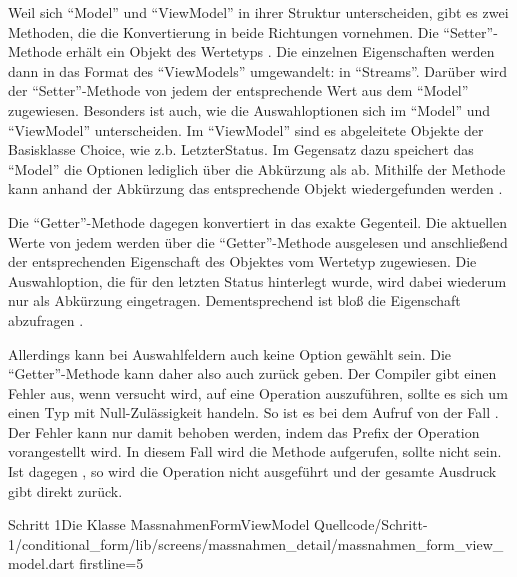 Weil sich \enquote{Model} und \enquote{ViewModel} in ihrer Struktur unterscheiden, gibt es zwei Methoden, die die Konvertierung in beide Richtungen vornehmen.
Die \enquote{Setter}-Methode   erhält ein Objekt des Wertetyps .
Die einzelnen Eigenschaften werden dann in das Format des \enquote{ViewModels} umgewandelt: in \enquote{Streams}.
Darüber wird der \enquote{Setter}-Methode  von jedem  der entsprechende Wert aus dem \enquote{Model} zugewiesen.
Besonders ist auch, wie die Auswahloptionen sich im \enquote{Model} und \enquote{ViewModel} unterscheiden.
Im \enquote{ViewModel} sind es abgeleitete Objekte der Basisklasse Choice, wie z.b. LetzterStatus.
Im Gegensatz dazu speichert das \enquote{Model} die Optionen lediglich über die Abkürzung als  ab.
Mithilfe der Methode  kann anhand der Abkürzung das entsprechende Objekt wiedergefunden werden .

Die \enquote{Getter}-Methode   dagegen konvertiert in das exakte Gegenteil.
Die aktuellen Werte von jedem  werden über die \enquote{Getter}-Methode  ausgelesen und anschließend der entsprechenden Eigenschaft des Objektes vom Wertetyp  zugewiesen.
Die Auswahloption, die für den letzten Status hinterlegt wurde, wird dabei wiederum nur als Abkürzung eingetragen.
Dementsprechend ist bloß die Eigenschaft  abzufragen .

Allerdings kann bei Auswahlfeldern auch keine Option gewählt sein.
Die \enquote{Getter}-Methode  kann daher also auch  zurück geben.
Der Compiler gibt einen Fehler aus, wenn versucht wird, auf  eine Operation auszuführen, sollte es sich um einen Typ mit Null-Zulässigkeit handeln.
So ist es bei dem Aufruf von  der Fall .
Der Fehler kann nur damit behoben werden, indem das Prefix   der Operation vorangestellt wird.
In diesem Fall wird die Methode aufgerufen, sollte  nicht  sein.
Ist  dagegen , so wird die Operation nicht ausgeführt und der gesamte Ausdruck gibt direkt  zurück.

\begin{alexlisting}{Schritt 1}{Die Klasse MassnahmenFormViewModel}
  {Quellcode/Schritt-1/conditional_form/lib/screens/massnahmen_detail/massnahmen_form_view_model.dart}
  {firstline=5}
  \label{lst:Schritt1KlasseMassnahmenFormViewModel}
\end{alexlisting}

